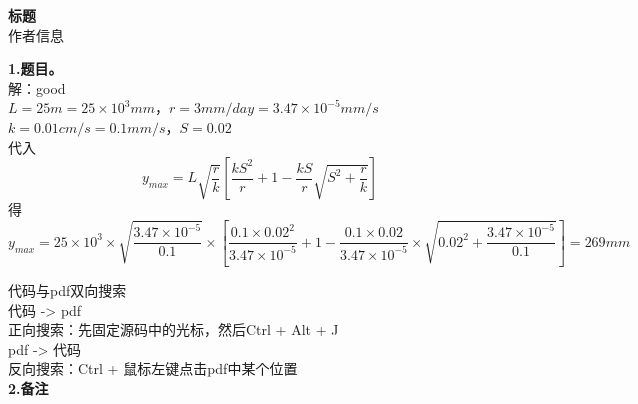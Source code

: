 \documentclass[a4paper,12pt]{article}     %
\begin{document}
\begin{center}   %
{\large \textbf{标题}}\\
作者信息
\end{center}

\noindent %
\textbf{1.题目。}\\
解：good\\
$L=25m=25\times10^3mm$，$r=3mm/day=3.47\times10^{-5}mm/s$\\
$k=0.01cm/s=0.1mm/s$，$S=0.02$
\\
代入$$y_{max}=L\sqrt{\frac{r}{k}}\left[\frac{kS^2}{r}+1-
\frac{kS}{r}\sqrt{S^2+\frac{r}{k}}\right]$$
得$$y_{max}=25\times10^3\times\sqrt{\frac{3.47\times10^{-5}}{0.1}}\times
\left[\frac{0.1\times0.02^2}{3.47\times10^{-5}}+1-\frac{0.1\times0.02}
{3.47\times10^{-5}}\times\sqrt{0.02^2+\frac{3.47\times10^{-5}}{0.1}}\right]=269mm$$

代码与pdf双向搜索 \\
代码 -> pdf \\
正向搜索：先固定源码中的光标，然后Ctrl + Alt + J \\
pdf -> 代码 \\
反向搜索：Ctrl + 鼠标左键点击pdf中某个位置 \\

\textbf{2.备注}\\
\end{document}
